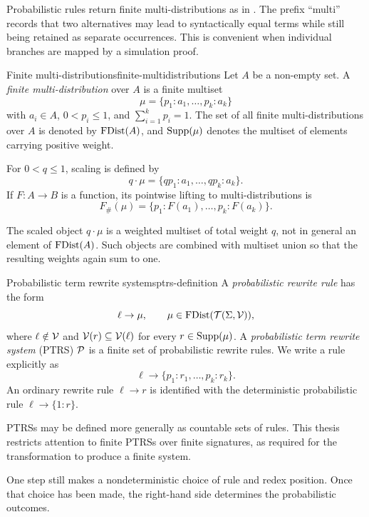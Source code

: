 Probabilistic rules return finite multi-distributions as in
\cite{avanzini_dallago_yamada_2020,kassing_giesl_2025}.  The prefix
\enquote{multi} records that two alternatives may lead to syntactically equal
terms while still being retained as separate occurrences.  This is convenient
when individual branches are mapped by a simulation proof.

\begin{Definition}{Finite multi-distributions}{finite-multidistributions}
  Let $A$ be a non-empty set.  A \emph{finite multi-distribution} over $A$ is
  a finite multiset
  \[
    \mu=\{p_1:a_1,\ldots,p_k:a_k\}
  \]
  with $a_i\in A$, $0<p_i\leq 1$, and $\sum_{i=1}^k p_i=1$.
  The set of all finite multi-distributions over $A$ is denoted by
  $\FDist(A)$, and $\Supp(\mu)$ denotes the multiset of elements carrying
  positive weight.

  For $0<q\leq1$, scaling is defined by
  \[
    q\cdot\mu=\{qp_1:a_1,\ldots,qp_k:a_k\}.
  \]
  If $F:A\to B$ is a function, its pointwise lifting to multi-distributions is
  \[
    F_\#(\mu)=\{p_1:F(a_1),\ldots,p_k:F(a_k)\}.
  \]
\end{Definition}

The scaled object $q\cdot\mu$ is a weighted multiset of total weight $q$, not
in general an element of $\FDist(A)$.  Such objects are combined with multiset
union so that the resulting weights again sum to one.

\begin{Definition}{Probabilistic term rewrite systems}{ptrs-definition}
  A \emph{probabilistic rewrite rule} has the form
  \[
    \ell\to\mu,
    \qquad
    \mu\in\FDist(\TSet{\Sigma}{\Var}),
  \]
  where $\ell\notin\Var$ and
  $\Var(r)\subseteq\Var(\ell)$ for every $r\in\Supp(\mu)$.  A
  \emph{probabilistic term rewrite system} (PTRS) $\P$ is a finite set of
  probabilistic rewrite rules.  We write a rule explicitly as
  \[
    \ell\to\{p_1:r_1,\ldots,p_k:r_k\}.
  \]
  An ordinary rewrite rule $\ell\to r$ is identified with the deterministic
  probabilistic rule $\ell\to\{1:r\}$.
\end{Definition}

PTRSs may be defined more generally as countable sets of rules.  This thesis
restricts attention to finite PTRSs over finite signatures, as required for the
transformation to produce a finite system.

One step still makes a nondeterministic choice of rule and redex position.  Once
that choice has been made, the right-hand side determines the probabilistic
outcomes.

